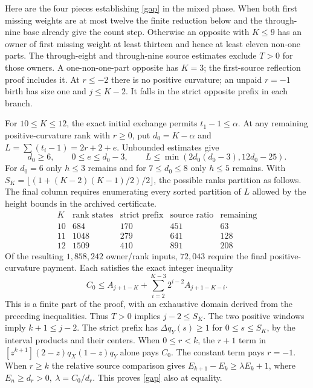 \documentclass[11pt]{article}
\begin{document}
Here are the four pieces establishing \eqref{gap} in the mixed phase.
When both first missing weights are at most twelve the finite
reduction below and the through-nine base already give the count step.
Otherwise an opposite with \(K\le9\) has an owner of first missing
weight at least thirteen and hence at least eleven non-one parts.
The through-eight and through-nine source estimates exclude \(T>0\)
for those owners. A one-non-one-part opposite has \(K=3\); the
first-source reflection proof includes it. At \(r\le-2\) there is
no positive curvature; an unpaid \(r=-1\) birth has size one and
\(j\le K-2\). It falls in the strict opposite prefix in each branch.

For \(10\le K\le12\), the exact initial exchange permits
\(t_1-1\le\alpha\). At any remaining positive-curvature rank with
\(r\ge0\), put \(d_0=K-\alpha\) and \(L=\sum(t_i-1)=2r+2+e\).
Unbounded estimates give
\[
 d_0\ge6,\qquad 0\le e\le d_0-3,\qquad
 L\le\min(2d_0(d_0-3),12d_0-25).
\]
For \(d_0=6\) only \(h\le3\) remains and for \(7\le d_0\le8\)
only \(h\le5\) remains. With \(S_K=\lfloor(1+(K-2)(K-1)/2)/2\rfloor\),
the possible ranks partition as follows. The final column requires
enumerating every sorted partition of \(L\) allowed by the height
bounds in the archived certificate.
\[
\begin{array}{c|r|rrr}
 K&\text{rank states}&\text{strict prefix}&\text{source ratio}&
     \text{remaining}\\ \hline
 10&684&170&451&63\\ 11&1048&279&641&128\\ 12&1509&410&891&208
\end{array}
\]
Of the resulting \(1{,}858{,}242\) owner/rank inputs,
\(72{,}043\) require the final positive-curvature payment. Each
satisfies the exact integer inequality
\[
 C_0\le A_{j+1-K}+\sum_{i=2}^{K-3}2^{i-2}A_{j+1-K-i}.
\]
This is a finite part of the proof, with an exhaustive domain derived
from the preceding inequalities. Thus \(T>0\) implies \(j-2\le S_K\).
The two positive windows imply \(k+1\le j-2\). The strict prefix
has \(\Delta q_Y(s)\ge1\) for \(0\le s\le S_K\), by the interval
products and their centers. When \(0\le r<k\), the \(r+1\) term in
\([z^{k+1}](2-z)q_X(1-z)q_Y\) alone pays \(C_0\). The constant
term pays \(r=-1\). When \(r\ge k\) the relative source comparison
gives \(E_{k+1}-E_k\ge\lambda E_k+1\), where
\(E_n\ge d_r>0,\ \lambda=C_0/d_r\). This proves \eqref{gap} also at equality.
\end{document}
